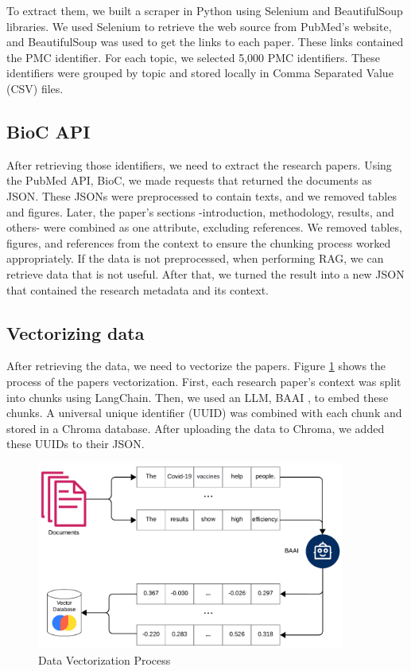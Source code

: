 To extract them, we built a scraper in Python using Selenium and BeautifulSoup libraries. We used Selenium to retrieve the web source from PubMed's website, and BeautifulSoup was used to get the links to each paper. These links contained the PMC identifier. For each topic, we selected 5,000 PMC identifiers. These identifiers were grouped by topic and stored locally in Comma Separated Value (CSV) files.

\subsection{BioC API}
After retrieving those identifiers, we need to extract the research papers. Using the PubMed API, BioC, we made requests that returned the documents as JSON. These JSONs were preprocessed to contain texts, and we removed tables and figures. Later, the paper's sections -introduction, methodology, results, and others- were combined as one attribute, excluding references. We removed tables, figures, and references from the context to ensure the chunking process worked appropriately. If the data is not preprocessed, when performing RAG, we can retrieve data that is not useful. After that, we turned the result into a new JSON that contained the research metadata and its context. 

\subsection{Vectorizing data}
After retrieving the data, we need to vectorize the papers. Figure \ref{fig:vector} shows the process of the papers vectorization. First, each research paper’s context was split into chunks using LangChain. Then, we used an LLM, BAAI \cite{bge_embedding}, to embed these chunks. A universal unique identifier (UUID) was combined with each chunk and stored in a Chroma \cite{chroma} database. After uploading the data to Chroma, we added these UUIDs to their JSON. 

\begin{figure}[H]
	\begin{center}
		\includegraphics[width=0.9\textwidth]{images/Data_vectorization.png} %
	\end{center}
	\caption{Data Vectorization Process} %
	\label{fig:vector}
\end{figure}


